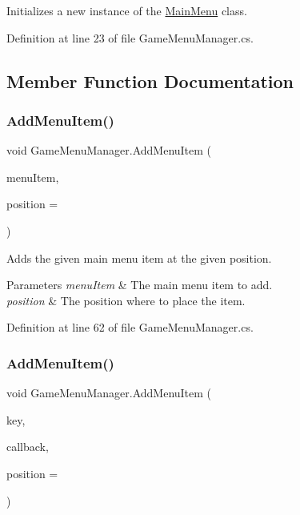 Initializes a new instance of the \hyperlink{class_main_menu}{Main\+Menu} class. 



Definition at line 23 of file Game\+Menu\+Manager.\+cs.



\subsection{Member Function Documentation}
\mbox{\label{class_game_menu_manager_a9619c435e22a9149b2ac6baa672ed018}} 
\subsubsection{\texorpdfstring{Add\+Menu\+Item()}{AddMenuItem()}\hspace{0.1cm}{\footnotesize\ttfamily [1/3]}}
{\footnotesize\ttfamily void Game\+Menu\+Manager.\+Add\+Menu\+Item (\begin{DoxyParamCaption}\item[{\hyperlink{class_game_menu_item}{Game\+Menu\+Item}}]{menu\+Item,  }\item[{int}]{position = {} }\end{DoxyParamCaption})}



Adds the given main menu item at the given position. 


\begin{DoxyParams}{Parameters}
{\em menu\+Item} & The main menu item to add.\\
\hline
{\em position} & The position where to place the item.\\
\hline
\end{DoxyParams}


Definition at line 62 of file Game\+Menu\+Manager.\+cs.

\mbox{\label{class_game_menu_manager_a0ce66a98816e59b4385d48b1dabb3cb4}} 
\subsubsection{\texorpdfstring{Add\+Menu\+Item()}{AddMenuItem()}\hspace{0.1cm}{\footnotesize\ttfamily [2/3]}}
{\footnotesize\ttfamily void Game\+Menu\+Manager.\+Add\+Menu\+Item (\begin{DoxyParamCaption}\item[{string}]{key,  }\item[{Action}]{callback,  }\item[{int}]{position = {} }\end{DoxyParamCaption})}



